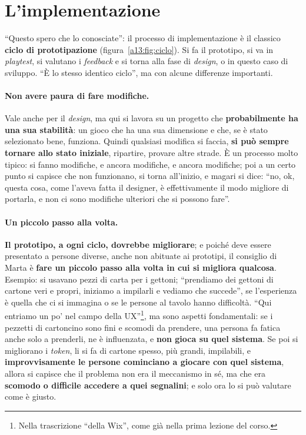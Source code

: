 \section{L'implementazione}
\label{a13:sec:implementazione}



``Questo spero che lo conosciate'': il processo di implementazione è il classico
\textbf{ciclo di prototipazione} (figura~\ref{a13:fig:ciclo}). Si fa il prototipo, si va
in \emph{playtest}, si valutano i \emph{feedback} e si torna alla fase di \emph{design}, o
in questo caso di sviluppo. ``È lo stesso identico ciclo'', ma con alcune differenze
importanti.

\paragraph{Non avere paura di fare modifiche.} Vale anche per il \emph{design}, ma qui si
lavora su un progetto che \textbf{probabilmente ha una sua stabilità}: un gioco che ha una
sua dimensione e che, se è stato selezionato bene, funziona. Quindi qualsiasi modifica si
faccia, \textbf{si può sempre tornare allo stato iniziale}, ripartire, provare altre strade.
È un processo molto tipico: si fanno modifiche, e ancora modifiche, e ancora modifiche;
poi a un certo punto si capisce che non funzionano, si torna all'inizio, e magari si dice:
``no, ok, questa cosa, come l'aveva fatta il designer, è effettivamente il modo migliore di
portarla, e non ci sono modifiche ulteriori che si possono fare''.

\paragraph{Un piccolo passo alla volta.} \textbf{Il prototipo, a ogni ciclo, dovrebbe
migliorare}; e poiché deve essere presentato a persone diverse, anche non abituate ai
prototipi, il consiglio di Marta è \textbf{fare un piccolo passo alla volta in cui si
migliora qualcosa}. Esempio: si usavano pezzi di carta per i gettoni; ``prendiamo dei gettoni
di cartone veri e propri, iniziamo a impilarli e vediamo che succede'', se l'esperienza è
quella che ci si immagina o se le persone al tavolo hanno difficoltà. ``Qui entriamo un po'
nel campo della UX''\footnote{Nella trascrizione ``della Wix'', come già nella prima lezione
del corso.}, ma sono aspetti fondamentali: se i pezzetti di cartoncino sono fini e scomodi
da prendere, una persona fa fatica anche solo a prenderli, ne è influenzata, e \textbf{non
gioca su quel sistema}. Se poi si migliorano i \emph{token}, li si fa di cartone spesso, più
grandi, impilabili, e \textbf{improvvisamente le persone cominciano a giocare con quel
sistema}, allora si capisce che il problema non era il meccanismo in sé, ma che era
\textbf{scomodo o difficile accedere a quei segnalini}; e solo ora lo si può valutare come è
giusto.

